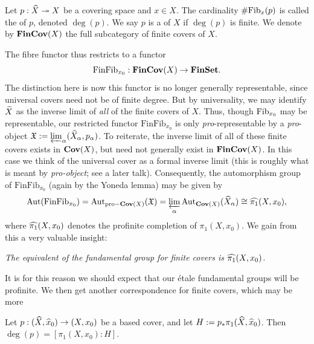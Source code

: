 \begin{defn}
	Let $p : \widehat{X} \twoheadrightarrow X$ be a covering space and $x \in X$. The cardinality $\#\mathrm{Fib}_{x}(p)$ is called the  of $p$, denoted $\deg(p)$. We say $p$ is a  of $X$ if $\deg(p)$ is finite. We denote by $\mathbf{FinCov}(X)$ the full subcategory of finite covers of $X$.
\end{defn}

The fibre functor thus restricts to a functor
\[
	\mathrm{FinFib}_{x_0} : \mathbf{FinCov}(X) \to \mathbf{FinSet}.
\]
The distinction here is now this functor is no longer generally representable, since universal covers need not be of finite degree. But by universality, we may identify $\widetilde{X}$ as the inverse limit of \emph{all} of the finite covers of $X$. Thus, though $\mathrm{Fib}_{x_0}$ may be representable, our restricted functor $\mathrm{FinFib}_{x_0}$ is only \emph{pro}-representable by a \emph{pro}-object $\mathfrak{X} := \varprojlim_\alpha (\widehat{X}_\alpha, p_{\alpha})$. To reiterate, the inverse limit of all of these finite covers exists in $\mathbf{Cov}(X)$, but need not generally exist in $\mathbf{FinCov}(X)$. In this case we think of the universal cover as a formal inverse limit (this is roughly what is meant by \emph{pro-object}; see a later talk). Consequently, the automorphism group of $\mathrm{FinFib}_{x_0}$ (again by the Yoneda lemma) may be given by 
\[
	\mathrm{Aut}(\mathrm{FinFib}_{x_0}) = \mathrm{Aut}_{\mathrm{pro-}\mathbf{Cov}(X)}(\mathfrak{X}) = \varprojlim_\alpha \mathrm{Aut}_{\mathbf{Cov}(X)}(\widehat{X}_\alpha) \cong \widehat{\pi_1}(X, x_0),
\]
where $\widehat{\pi_1}(X, x_0)$ denotes the profinite completion of $\pi_1(X,x_0)$. We gain from this a very valuable insight:
\begin{center}
	\emph{The equivalent of the fundamental group for finite covers is $\widehat{\pi_1}(X,x_0)$.}
\end{center}
It is for this reason we should expect that our \'etale fundamental groups will be profinite. We then get another correspondence for finite covers, which may be more 


\begin{lemma}
	\label{lemma:degree_equals_index_covers}
	Let $p:(\widehat{X}, \widehat{x}_0) \to (X, x_0)$ be a based cover, and let $H := p_* \pi_1(\widehat{X}, \widehat{x}_0)$. Then $\deg(p) = [\pi_1(X, x_0) : H]$.
\end{lemma}

